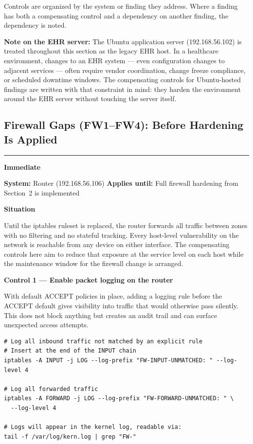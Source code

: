 \documentclass[12pt]{article}
\newcommand{\tfbadge}[2]{%
  \colorbox{#1}{\color{white}\textbf{\small #2}}%
}
\newcommand{\sectionrule}{%
  \vspace{4pt}\noindent\textcolor{headercol}{\rule{\linewidth}{0.8pt}}\vspace{4pt}%
}
\begin{document}
Controls are organized by the system or finding they address. Where a finding
has both a compensating control and a dependency on another finding, the
dependency is noted.
 
\begin{notebox}
\textbf{Note on the EHR server:} The Ubuntu application server
(192.168.56.102) is treated throughout this section as the legacy EHR host.
In a healthcare environment, changes to an EHR system --- even configuration
changes to adjacent services --- often require vendor coordination, change
freeze compliance, or scheduled downtime windows. The compensating controls
for Ubuntu-hosted findings are written with that constraint in mind:
they harden the environment around the EHR server without touching the
server itself.
\end{notebox}
 
\subsection{Firewall Gaps (FW1--FW4): Before Hardening Is Applied}
\sectionrule
 
\noindent\tfbadge{immediatecol}{Immediate}
\quad\textbf{System:} Router (192.168.56.106)
\quad\textbf{Applies until:} Full firewall hardening from Section~2 is
implemented
 
\bigskip
\noindent\textbf{Situation}
 
Until the iptables ruleset is replaced, the router forwards all traffic
between zones with no filtering and no stateful tracking. Every host-level
vulnerability on the network is reachable from any device on either interface.
The compensating controls here aim to reduce that exposure at the service
level on each host while the maintenance window for the firewall change is
arranged.
 
\bigskip
\noindent\textbf{Control 1 --- Enable packet logging on the router}
 
With default ACCEPT policies in place, adding a logging rule before the
ACCEPT default gives visibility into traffic that would otherwise pass
silently. This does not block anything but creates an audit trail and can
surface unexpected access attempts.
 
\begin{lstlisting}[style=terminal]
# Log all inbound traffic not matched by an explicit rule
# Insert at the end of the INPUT chain
iptables -A INPUT -j LOG --log-prefix "FW-INPUT-UNMATCHED: " --log-level 4
 
# Log all forwarded traffic
iptables -A FORWARD -j LOG --log-prefix "FW-FORWARD-UNMATCHED: " \
  --log-level 4
 
# Logs will appear in the kernel log, readable via:
tail -f /var/log/kern.log | grep "FW-"
\end{lstlisting}
 
\end{document}
